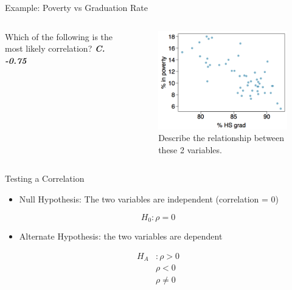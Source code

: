 \documentclass[
  ignorenonframetext,
]{beamer}
\providecommand{\tightlist}{%
  \setlength{\itemsep}{0pt}\setlength{\parskip}{0pt}}\usepackage{longtable,booktabs,array}
\begin{document}
\begin{frame}{Example: Poverty vs Graduation Rate}
\label{example-poverty-vs-graduation-rate-3}
\begin{columns}[T]
\begin{column}{0.48\textwidth}
Which of the following is the most likely correlation?
\textbf{\emph{C.}} \textbf{\emph{-0.75}}
\end{column}

\begin{column}{0.48\textwidth}
\begin{figure}[H]

{\centering \includegraphics{class31_files/mediabag/poverty-vs-grad-rate.png}

}

\caption{Describe the relationship between these 2 variables.}

\end{figure}%
\end{column}
\end{columns}
\end{frame}

\begin{frame}{Testing a Correlation}
\label{testing-a-correlation}
\begin{itemize}
\tightlist
\item
  Null Hypothesis: The two variables are independent (correlation = 0)
\end{itemize}

\[
H_0 \colon \rho=0
\]

\pause

\begin{itemize}
\tightlist
\item
  Alternate Hypothesis: the two variables are dependent
\end{itemize}

\[
\begin{aligned}
H_A &\colon \rho > 0 \\
& \rho < 0 \\
& \rho \ne 0 \\
\end{aligned}
\]
\end{frame}
\end{document}
